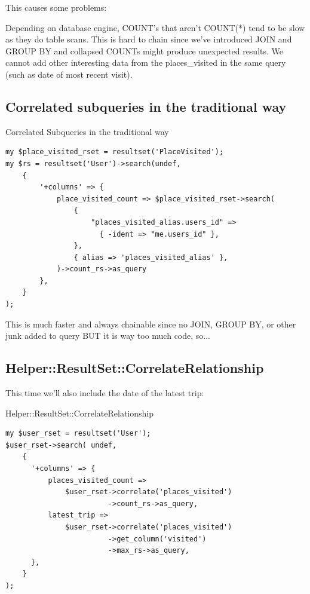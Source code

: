 This causes some problems:

Depending on database engine, COUNT’s that aren’t COUNT(*) tend to be slow
as they do table scans. 
This is hard to chain since we've introduced JOIN and GROUP BY and collapsed
COUNTs might produce unexpected results. 
We cannot add other interesting data from the places\_visited in the same query
(such as date of most recent visit).

\subsection{Correlated subqueries in the traditional way}

\begin{frame}[fragile]{Correlated Subqueries in the traditional way}
\begin{lstlisting}
my $place_visited_rset = resultset('PlaceVisited');
my $rs = resultset('User')->search(undef,
    {
        '+columns' => {
            place_visited_count => $place_visited_rset->search(
                {
                    "places_visited_alias.users_id" =>
                      { -ident => "me.users_id" },
                },
                { alias => 'places_visited_alias' },
            )->count_rs->as_query
        },
    }
);
\end{lstlisting}
\end{frame}

This is much faster and always chainable since no JOIN, GROUP BY, or other junk added to query BUT it is way too much code, so...

\subsection{Helper::ResultSet::CorrelateRelationship}

This time we'll also include the date of the latest trip:

\begin{frame}[fragile]{Helper::ResultSet::CorrelateRelationship}
\begin{lstlisting}
my $user_rset = resultset('User');
$user_rset->search( undef,
    {
      '+columns' => {
          places_visited_count =>
              $user_rset->correlate('places_visited')
                        ->count_rs->as_query,
          latest_trip =>
              $user_rset->correlate('places_visited')
                        ->get_column('visited')
                        ->max_rs->as_query,
      },
    }
);
\end{lstlisting}
\end{frame}



